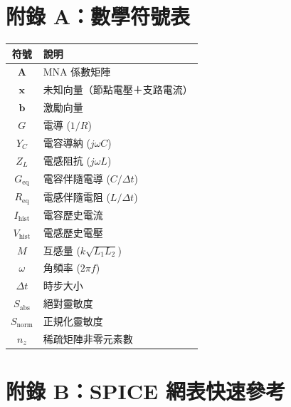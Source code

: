 \documentclass[12pt,a4paper]{article}
\begin{document}
\section*{附錄 A：數學符號表}

\begin{longtable}{cl}
\toprule
\textbf{符號} & \textbf{說明} \\
\midrule
\endfirsthead
$\mathbf{A}$ & MNA 係數矩陣 \\
$\mathbf{x}$ & 未知向量（節點電壓＋支路電流）\\
$\mathbf{b}$ & 激勵向量 \\
$G$ & 電導 ($1/R$) \\
$Y_C$ & 電容導納 ($j\omega C$) \\
$Z_L$ & 電感阻抗 ($j\omega L$) \\
$G_{\text{eq}}$ & 電容伴隨電導 ($C/\Delta t$) \\
$R_{\text{eq}}$ & 電感伴隨電阻 ($L/\Delta t$) \\
$I_{\text{hist}}$ & 電容歷史電流 \\
$V_{\text{hist}}$ & 電感歷史電壓 \\
$M$ & 互感量 ($k\sqrt{L_1 L_2}$) \\
$\omega$ & 角頻率 ($2\pi f$) \\
$\Delta t$ & 時步大小 \\
$S_{\text{abs}}$ & 絕對靈敏度 \\
$S_{\text{norm}}$ & 正規化靈敏度 \\
$n_z$ & 稀疏矩陣非零元素數 \\
\bottomrule
\end{longtable}

\section*{附錄 B：SPICE 網表快速參考}
\end{document}
